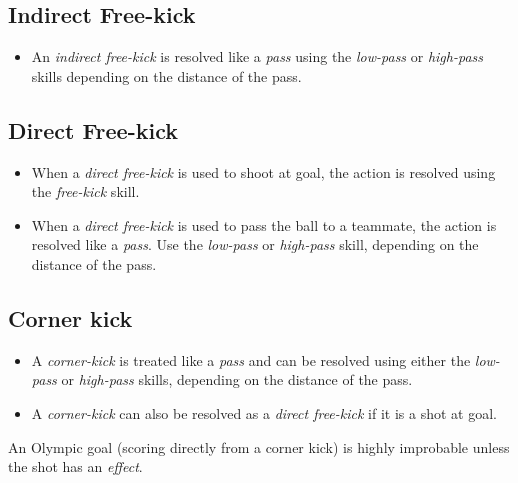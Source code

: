 \documentclass[12pt]{article}
\begin{document}
\subsection{Indirect Free-kick}

\begin{rulebox}
\begin{itemize}
\item An \emph{indirect free-kick} is resolved like a \emph{pass} using the \emph{low-pass} or \emph{high-pass} skills depending on the distance of the pass.
\end{itemize}
\end{rulebox}

\subsection{Direct Free-kick}

\begin{rulebox}
\begin{itemize}
\item When a \emph{direct free-kick} is used to shoot at goal, the action is resolved using the \emph{free-kick} skill.
\item When a \emph{direct free-kick} is used to pass the ball to a teammate, the action is resolved like a \emph{pass}. Use the \emph{low-pass} or \emph{high-pass} skill, depending on the distance of the pass.
\end{itemize}
\end{rulebox}

\subsection{Corner kick}

\begin{rulebox}
\begin{itemize}
\item A \emph{corner-kick} is treated like a \emph{pass} and can be resolved using either the \emph{low-pass} or \emph{high-pass} skills, depending on the distance of the pass.
\item A \emph{corner-kick} can also be resolved as a \emph{direct free-kick} if it is a shot at goal.
\end{itemize}
\end{rulebox}

\begin{note}
An Olympic goal (scoring directly from a corner kick) is highly improbable unless the shot has an \emph{effect}.
\end{note}
\end{document}
